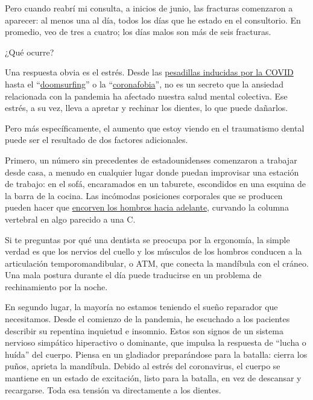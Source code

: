 Pero cuando reabrí mi consulta, a inicios de junio, las fracturas
comenzaron a aparecer: al menos una al día, todos los días que he estado
en el consultorio. En promedio, veo de tres a cuatro; los días malos son
más de seis fracturas.

¿Qué ocurre?

Una respuesta obvia es el estrés. Desde las
\href{https://www.nytimes3xbfgragh.onion/2020/04/13/style/why-weird-dreams-coronavirus.html}{pesadillas
inducidas por la COVID} hasta el
``\href{https://www.nytimes3xbfgragh.onion/es/2020/07/22/espanol/negocios/doomscrolling-que-es.html}{doomsurfing}''
o la
``\href{https://www.wellandgood.com/coronavirus-anxiety-scale-coronaphobia/}{coronafobia}'',
no es un secreto que la ansiedad relacionada con la pandemia ha afectado
nuestra salud mental colectiva. Ese estrés, a su vez, lleva a apretar y
rechinar los dientes, lo que puede dañarlos.

Pero más específicamente, el aumento que estoy viendo en el traumatismo
dental puede ser el resultado de dos factores adicionales.

Primero, un número sin precedentes de estadounidenses comenzaron a
trabajar desde casa, a menudo en cualquier lugar donde puedan improvisar
una estación de trabajo: en el sofá, encaramados en un taburete,
escondidos en una esquina de la barra de la cocina. Las incómodas
posiciones corporales que se producen pueden hacer que
\href{https://www.nytimes3xbfgragh.onion/2020/09/04/well/live/ergonomics-work-from-home-injuries.html}{encorven
los hombros hacia adelante}, curvando la columna vertebral en algo
parecido a una C.

Si te preguntas por qué una dentista se preocupa por la ergonomía, la
simple verdad es que los nervios del cuello y los músculos de los
hombros conducen a la articulación temporomandibular, o ATM, que conecta
la mandíbula con el cráneo. Una mala postura durante el día puede
traducirse en un problema de rechinamiento por la noche.

En segundo lugar, la mayoría no estamos teniendo el sueño reparador que
necesitamos. Desde el comienzo de la pandemia, he escuchado a los
pacientes describir su repentina inquietud e insomnio. Estos son signos
de un sistema nervioso simpático hiperactivo o dominante, que impulsa la
respuesta de ``lucha o huída'' del cuerpo. Piensa en un gladiador
preparándose para la batalla: cierra los puños, aprieta la mandíbula.
Debido al estrés del coronavirus, el cuerpo se mantiene en un estado de
excitación, listo para la batalla, en vez de descansar y recargarse.
Toda esa tensión va directamente a los dientes.

